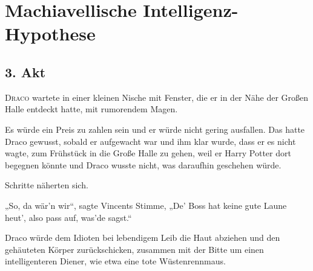 \chapter{Machiavellische Intelligenz-Hypothese}


\section{3. Akt}

\lettrine{D}{raco} wartete in einer kleinen Nische mit Fenster, die er in der Nähe der Großen Halle entdeckt hatte, mit rumorendem Magen.

Es würde ein Preis zu zahlen sein und er würde nicht gering ausfallen. Das hatte Draco gewusst, sobald er aufgewacht war und ihm klar wurde, dass er es nicht wagte, zum Frühstück in die Große Halle zu gehen, weil er Harry Potter dort begegnen könnte und Draco wusste nicht, was daraufhin geschehen würde.

Schritte näherten sich.

„So, da wär’n wir“, sagte Vincents Stimme,
„De’ Boss hat keine gute Laune heut’, also pass auf, was’de sagst.“

Draco würde dem Idioten bei lebendigem Leib die Haut abziehen und den gehäuteten Körper zurückschicken, zusammen mit der Bitte um einen intelligenteren Diener, wie etwa eine tote Wüstenrennmaus.

